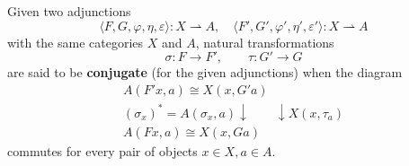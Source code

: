 Given two adjunctions
$$\langle F, G, \varphi, \eta, \varepsilon \rangle : X \rightharpoonup A, \quad \langle F', G', \varphi', \eta', \varepsilon' \rangle : X \rightharpoonup A$$
with the same categories $X$ and $A$, natural transformations
$$\sigma : F \to F', \qquad \tau : G' \to G$$
are said to be \textbf{conjugate} (for the given adjunctions) when the diagram
$$\begin{array}{c}
A(F'x, a) \cong X(x, G'a) \\
(\sigma_x)^* = A(\sigma_x, a) \downarrow \quad \quad \downarrow X(x, \tau_a) \\
A(Fx, a) \cong X(x, Ga)
\end{array}$$
commutes for every pair of objects $x \in X, a \in A$.

